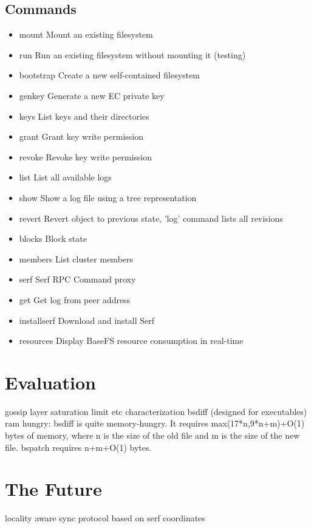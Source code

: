 \documentclass{sig-alternate}
\begin{document}
\subsection{Commands}

\begin{itemize}
 \item mount	Mount an existing filesystem
 \item run		Run an existing filesystem without mounting it (testing)
 \item bootstrap	Create a new self-contained filesystem
 \item genkey	Generate a new EC private key
 \item keys	List keys and their directories
 \item grant	Grant key write permission
 \item revoke	Revoke key write permission
 \item list	List all available logs
 \item show	Show a log file using a tree representation
 \item revert	Revert object to previous state, 'log' command lists all revisions
 \item blocks	Block state
 \item members	List cluster members
 \item serf	Serf RPC Command proxy
 \item get		Get log from peer address
 \item installserf	Download and install Serf
 \item resources	Display BaseFS resource consumption in real-time
\end{itemize}


\section{Evaluation}





gossip layer saturation limit
etc characterization
    bsdiff (designed for executables) ram hungry: bsdiff is quite memory-hungry. It requires max(17*n,9*n+m)+O(1) bytes of memory, where n is the size of the old file and m is the size of the new file. bspatch requires n+m+O(1) bytes.




\section{The Future}
locality aware sync protocol based on serf coordinates
\end{document}
